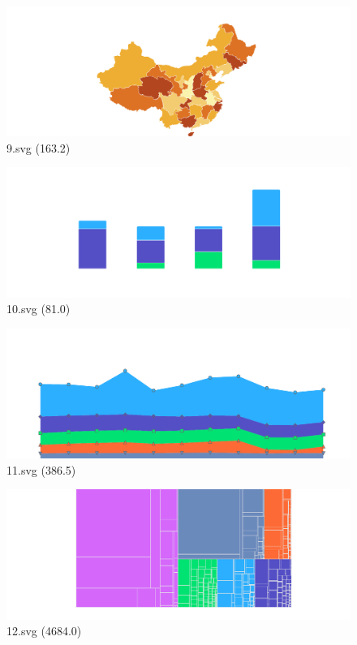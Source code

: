 \documentclass[journal]{IEEEtran}
\begin{document}
\begin{figure}[!htbp]
\centering
\begin{minipage}{0.233\columnwidth}
\centering
\includegraphics[width=\textwidth]{Train_set/9.pdf}
{9.svg (163.2)}
\end{minipage}
\hfill
\begin{minipage}{0.233\columnwidth}
\centering
\includegraphics[width=\textwidth]{Train_set/10.pdf}
{10.svg (81.0)}
\end{minipage}
\hfill
\begin{minipage}{0.233\columnwidth}
\centering
\includegraphics[width=\textwidth]{Train_set/11.pdf}
{11.svg (386.5)}
\end{minipage}
\hfill
\begin{minipage}{0.233\columnwidth}
\centering
\includegraphics[width=\textwidth]{Train_set/12.pdf}
{12.svg (4684.0)}
\end{minipage}
\end{figure}
\end{document}
